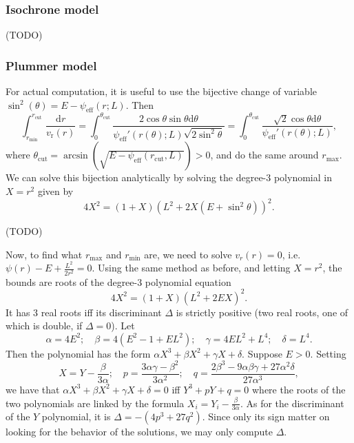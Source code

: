 \documentclass[11pt]{article}
\newcommand{\rr}{\mathrm{r}}
\newcommand{\vr}{v_{\rr}}
\newcommand{\rd}{{\mathrm{d}}}
\newcommand{\rmax}{r_{\max}}
\newcommand{\rmin}{r_{\min}}
\newcommand{\rcut}{r_{{\mathrm{cut}}}}
\newcommand{\tcut}{\theta_{{\mathrm{cut}}}}
\newcommand{\psieff}{\psi_{\mathrm{eff}}}
\begin{document}
\subsubsection{Isochrone model}
\label{subsubsec:IsochroneOrbitStudy}

(TODO)

\subsubsection{Plummer model}
\label{subsubsec:PlummerOrbitStudy}

For actual computation, it is useful to use the bijective change of variable $\sin^{2}(\theta) = E-\psieff(r;L)$. Then 
\begin{equation}
  \int_{\rmin}^{\rcut}\frac{{\rd}r}{\vr(r)}=\int_{0}^{\tcut}\frac{2\cos\theta\sin\theta{\rd}\theta}{\psieff'(r(\theta);L)\sqrt{2\sin^{2}\theta}}=\int_{0}^{\tcut}\frac{\sqrt{2}\cos\theta{\rd}\theta}{\psieff'(r(\theta);L)} ,
  \label{eq:change_variable_period}
\end{equation}
where $\tcut = \arcsin({\sqrt{E-\psieff(\rcut,L)}})>0$, and do the same around $\rmax$. We can solve this bijection analytically by solving the degree-3 polynomial in $X=r^{2}$ given by
\begin{equation}
4X^{2}=(1+X)(L^{2}+2X(E+\sin^{2}\theta))^{2} .
\label{eq:bijection_polynomial}
\end{equation}

(TODO)

Now, to find what $\rmax$ and $\rmin$ are, we need to
solve $v_{r}(r)=0$, i.e.  $\psi(r)-E+\frac{L^{2}}{2r^{2}}=0$. Using the same method as before, and letting $X=r^{2}$, the bounds are roots of the degree-3 polynomial equation
\begin{equation}
4X^{2}=(1+X)(L^{2}+2EX)^{2} .
\label{eq:bounds_polynomial}
\end{equation}
It has 3 real roots iff its
discriminant $\Delta$ is strictly positive (two real roots, one of
which is double, if $\Delta=0$).  Let
\begin{equation}
\alpha=4E^{2};\quad\beta=4(E^{2}-1+EL^{2});\quad\gamma=4EL^{2}+L^{4};\quad\delta=L^{4}.
\label{eq:coeff_poly_bound}
\end{equation}
Then the polynomial has the form $\alpha X^{3}+\beta X^{2}+\gamma X+\delta$.
Suppose $E>0$. Setting 
\begin{equation}
X=Y-\frac{\beta}{3\alpha};\quad p=\frac{3\alpha\gamma-\beta^{2}}{3\alpha^{2}};\quad q=\frac{2\beta^{3}-9\alpha\beta\gamma+27\alpha^{2}\delta}{27\alpha^{3}},
\label{eq:Change_poly_variable}
\end{equation}
we have that $\alpha X^{3}+\beta X^{2}+\gamma X+\delta=0$ iff $Y^{3}+pY+q=0$
where the roots of the two polynomials are linked by the formula $X_{i}=Y_{i}-\frac{\beta}{3\alpha}.$
As for the discriminant of the $Y$ polynomial, it is $\Delta=-(4p^{3}+27q^{2})$. Since only its sign matter on looking for the behavior of the solutions,
we may only compute $\Delta$.
\end{document}
